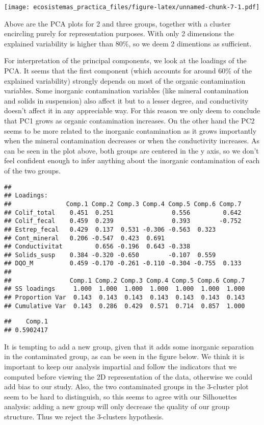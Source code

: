 \documentclass[]{article}
\begin{document}
\texttt{[image: ecosistemas\_practica\_files/figure-latex/unnamed-chunk-7-1.pdf]}

Above are the PCA plots for 2 and three groups, together with a cluster
encircling purely for representation purposes. With only 2 dimensions
the explained variability is higher than 80\%, so we deem 2 dimentions
as sufficient.

For interpretation of the principal components, we look at the loadings
of the PCA. It seems that the first component (which accounts for around
60\% of the explained variability) strongly depends on most of the
organic contamination variables. Some inorganic contamination variables
(like mineral contamination and solids in suspension) also affect it but
to a lesser degree, and conductivity doesn't affect it in any
appreciable way. For this reason we only deem to conclude that PC1 grows
as organic contamination increases. On the other hand the PC2 seems to
be more related to the inorganic contamination as it grows importantly
when the mineral contamination decreases or when the conductivity
increases. As can be seen in the plot above, both groups are centered in
the y axis, so we don't feel confident enough to infer anything about
the inorganic contamination of each of the two groups.

\begin{verbatim}
## 
## Loadings:
##               Comp.1 Comp.2 Comp.3 Comp.4 Comp.5 Comp.6 Comp.7
## Colif_total    0.451  0.251                0.556         0.642
## Colif_fecal    0.459  0.239                0.393        -0.752
## Estrep_fecal   0.429  0.137  0.531 -0.306 -0.563  0.323       
## Cont_mineral   0.206 -0.547  0.423  0.691                     
## Conductivitat         0.656 -0.196  0.643 -0.338              
## Solids_susp    0.384 -0.320 -0.650        -0.107  0.559       
## DQO_M          0.459 -0.170 -0.261 -0.110 -0.304 -0.755  0.133
## 
##                Comp.1 Comp.2 Comp.3 Comp.4 Comp.5 Comp.6 Comp.7
## SS loadings     1.000  1.000  1.000  1.000  1.000  1.000  1.000
## Proportion Var  0.143  0.143  0.143  0.143  0.143  0.143  0.143
## Cumulative Var  0.143  0.286  0.429  0.571  0.714  0.857  1.000
\end{verbatim}

\begin{verbatim}
##    Comp.1 
## 0.5902417
\end{verbatim}

It is tempting to add a new group, given that it adds some inorganic
separation in the contaminated group, as can be seen in the figure
below. We think it is important to keep our analysis impartial and
follow the indicators that we computed before viewing the 2D
representation of the data, otherwise we could add bias to our study.
Also, the two contaminated groups in the 3-cluster plot seem to be hard
to distinguish, so this seems to agree with our Silhouettes analysis:
adding a new group will only decrease the quality of our group
structure. Thus we reject the 3-clusters hypothesis.
\end{document}
